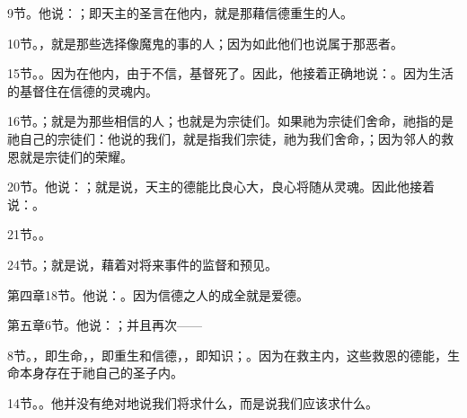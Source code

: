  9节。他说：；即天主的圣言在他内，就是那藉信德重生的人。\par

 10节。，就是那些选择像魔鬼的事的人；因为如此他们也说属于那恶者。\par

 15节。。因为在他内，由于不信，基督死了。因此，他接着正确地说：。因为生活的基督住在信德的灵魂内。\par

 16节。；就是为那些相信的人；也就是为宗徒们。如果祂为宗徒们舍命，祂指的是祂自己的宗徒们：他说的我们，就是指我们宗徒，祂为我们舍命，；因为邻人的救恩就是宗徒们的荣耀。\par

 20节。他说：；就是说，天主的德能比良心大，良心将随从灵魂。因此他接着说：。\par

 21节。。\par

 24节。；就是说，藉着对将来事件的监督和预见。\par

 第四章18节。他说：。因为信德之人的成全就是爱德。\par

 第五章6节。他说：；并且再次——\par

 8节。，即生命，，即重生和信德，，即知识；。因为在救主内，这些救恩的德能，生命本身存在于祂自己的圣子内。\par

 14节。。他并没有绝对地说我们将求什么，而是说我们应该求什么。\par

